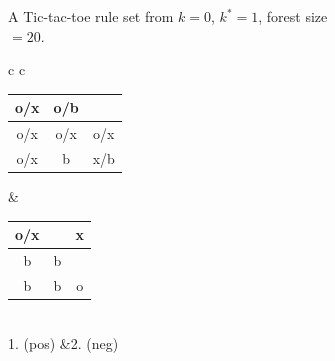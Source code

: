 \documentclass[11pt]{article}
\begin{document}
\begin{figure}[!ht]
\begin{subfigure}{\textwidth}
\begin{tabular}{c c}
\end{tabular}
\caption{A Tic-tac-toe rule set from $k=0$, $k^*=1$, forest size $=20$.}
\label{fig:ttt0-1-20}\end{subfigure}
\vspace{1em}

\begin{subfigure}{\textwidth}
\centering
\begin{tabular}{c c}
	\begin{small}
	\begin{tabular}{c|c|c}
	\hspace*{-0.4em}o/x\hspace*{-0.4em}&\hspace*{-0.4em}o/b\hspace*{-0.4em}&  \\ \hline
	\hspace*{-0.4em}o/x\hspace*{-0.4em}&\hspace*{-0.4em}o/x\hspace*{-0.4em}&\hspace*{-0.4em}o/x\hspace*{-0.4em}\\ \hline
	\hspace*{-0.4em}o/x\hspace*{-0.4em}&\hspace*{-0.4em}b\hspace*{-0.4em}&\hspace*{-0.4em}x/b\hspace*{-0.4em}  
	\end{tabular}
	\end{small}
	&
	\begin{small}
	\begin{tabular}{c|c|c}
	\hspace*{-0.4em}o/x\hspace*{-0.4em}&&\hspace*{-0.4em}x\hspace*{-0.4em}\\ \hline
	\hspace*{-0.4em}b\hspace*{-0.4em}&\hspace*{-0.4em}b\hspace*{-0.4em}&  \\ \hline
	\hspace*{-0.4em}b\hspace*{-0.4em}&\hspace*{-0.4em}b\hspace*{-0.4em}&\hspace*{-0.4em}o\hspace*{-0.4em}
	\end{tabular}
	\end{small}\\
	1. (pos) &2. (neg)


\end{tabular}
\end{subfigure}
\end{figure}
\end{document}
